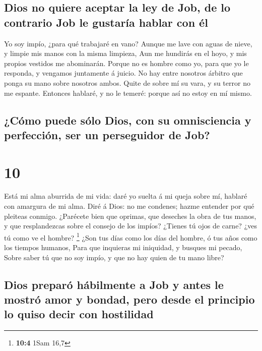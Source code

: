 \hypertarget{dios-no-quiere-aceptar-la-ley-de-job-de-lo-contrario-job-le-gustaruxeda-hablar-con-uxe9l}{%
\subsection{Dios no quiere aceptar la ley de Job, de lo contrario Job le
gustaría hablar con
él}\label{dios-no-quiere-aceptar-la-ley-de-job-de-lo-contrario-job-le-gustaruxeda-hablar-con-uxe9l}}

 Yo soy impío, ¿para qué trabajaré en vano? 
Aunque me lave con aguas de nieve, y limpie mis manos con la misma
limpieza,  Aun me hundirás en el hoyo, y mis propios
vestidos me abominarán.  Porque no es hombre como yo, para
que yo le responda, y vengamos juntamente á juicio.  No hay
entre nosotros árbitro que ponga su mano sobre nosotros ambos.
 Quite de sobre mí su vara, y su terror no me espante.
 Entonces hablaré, y no le temeré: porque así no estoy en
mí mismo.

\hypertarget{cuxf3mo-puede-suxf3lo-dios-con-su-omnisciencia-y-perfecciuxf3n-ser-un-perseguidor-de-job}{%
\subsection{¿Cómo puede sólo Dios, con su omnisciencia y perfección, ser
un perseguidor de
Job?}\label{cuxf3mo-puede-suxf3lo-dios-con-su-omnisciencia-y-perfecciuxf3n-ser-un-perseguidor-de-job}}

\hypertarget{section-9}{%
\section{10}\label{section-9}}

 Está mi alma aburrida de mi vida: daré yo suelta á mi queja
sobre mí, hablaré con amargura de mi alma.  Diré á Dios: no
me condenes; hazme entender por qué pleiteas conmigo. 
¿Parécete bien que oprimas, que deseches la obra de tus manos, y que
resplandezcas sobre el consejo de los impíos?  ¿Tienes tú
ojos de carne? ¿ves tú como ve el hombre? \footnote{\textbf{10:4} 1Sam
  16,7}  ¿Son tus días como los días del hombre, ó tus años
como los tiempos humanos,  Para que inquieras mi iniquidad,
y busques mi pecado,  Sobre saber tú que no soy impío, y que
no hay quien de tu mano libre?

\hypertarget{dios-preparuxf3-huxe1bilmente-a-job-y-antes-le-mostruxf3-amor-y-bondad-pero-desde-el-principio-lo-quiso-decir-con-hostilidad}{%
\subsection{Dios preparó hábilmente a Job y antes le mostró amor y
bondad, pero desde el principio lo quiso decir con
hostilidad}\label{dios-preparuxf3-huxe1bilmente-a-job-y-antes-le-mostruxf3-amor-y-bondad-pero-desde-el-principio-lo-quiso-decir-con-hostilidad}}

